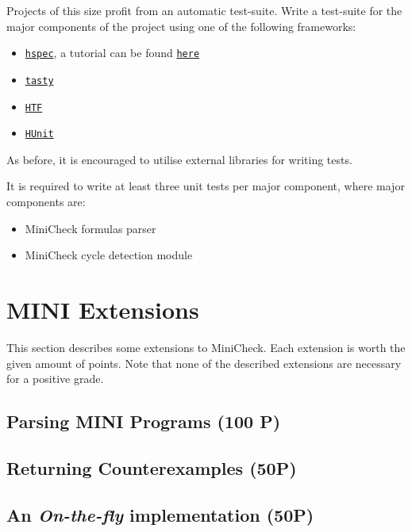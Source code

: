 \documentclass{article}
\begin{document}
Projects of this size profit from an automatic test-suite. Write a test-suite for the major components of the project using one of the following frameworks:

\begin{itemize}
\item \href{https://hackage.haskell.org/package/hspec}{\texttt{hspec}}, a tutorial can be found \href{https://hspec.github.io/}{\texttt{here}}
\item \href{https://hackage.haskell.org/package/tasty}{\texttt{tasty}}
\item \href{https://hackage.haskell.org/package/HTF}{\texttt{HTF}}
\item \href{https://hackage.haskell.org/package/HUnit}{\texttt{HUnit}}
\end{itemize}

As before, it is encouraged to utilise external libraries for writing tests.

It is required to write at least three unit tests per major component, where major components are:

\begin{itemize}
\item MiniCheck formulas parser
\item MiniCheck cycle detection module
\end{itemize}

\section{MINI Extensions}
This section describes some extensions to MiniCheck. Each extension is worth the given amount of points. 
Note that none of the described extensions are necessary for a positive grade.

\subsection{Parsing MINI Programs (100 P)}

\subsection{Returning Counterexamples (50P)}

\subsection{An \textit{On-the-fly} implementation (50P)}
\end{document}
